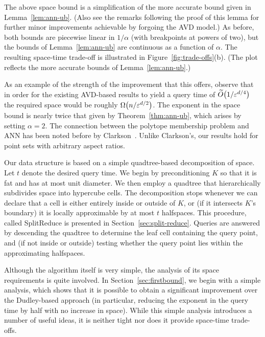 \documentclass[11pt]{article}   \usepackage[letterpaper,hmargin=2.1cm,vmargin=3cm]{geometry}
\newcommand{\SoftOh}{\widetilde{O}}
\newcommand{\alg}{\textrm{SplitReduce}}
\begin{document}
The above space bound is a simplification of the more accurate bound given in Lemma~\ref{lem:ann-ub}. (Also see the remarks following the proof of this lemma for further minor improvements achievable by forgoing the AVD model.) As before, both bounds are piecewise linear in $1/\alpha$ (with breakpoints at powers of two), but the bounds of Lemma~\ref{lem:ann-ub} are continuous as a function of $\alpha$. The resulting space-time trade-off is illustrated in Figure~\ref{fig:trade-offs}(b). (The plot reflects the more accurate bounds of Lemma~\ref{lem:ann-ub}.)

As an example of the strength of the improvement that this offers, observe that in order for the existing AVD-based results to yield a query time of $\SoftOh\big(1/\eps^{d/4}\big)$ the required space would be roughly $\Omega\big(n/\varepsilon^{d/2}\big)$. The exponent in the space bound is nearly twice that given by Theorem~\ref{thm:ann-ub}, which arises by setting $\alpha = 2$. The connection between the polytope membership problem and ANN has been noted before by Clarkson~\cite{Clarkson-ANN}. Unlike Clarkson's, our results hold for point sets with arbitrary aspect ratios.



\medskip

Our data structure is based on a simple quadtree-based decomposition of space. Let $t$ denote the desired query time. We begin by preconditioning $K$ so that it is fat and has at most unit diameter. We then employ a quadtree that hierarchically subdivides space into hypercube cells. The decomposition stops whenever we can declare that a cell is either entirely inside or outside of $K$, or (if it intersects $K$'s boundary) it is locally approximable by at most $t$ halfspaces. This procedure, called {\alg} is presented in Section~\ref{sec:split-reduce}. Queries are answered by descending the quadtree to determine the leaf cell containing the query point, and (if not inside or outside) testing whether the query point lies within the approximating halfspaces. 

Although the algorithm itself is very simple, the analysis of its space requirements is quite involved. In Section~\ref{sec:firstbound}, we begin with a simple analysis, which shows that it is possible to obtain a significant improvement over the Dudley-based approach (in particular, reducing the exponent in the query time by  half with no increase in space). While this simple analysis introduces a number of useful ideas, it is neither tight nor does it provide space-time trade-offs. 
\end{document}

